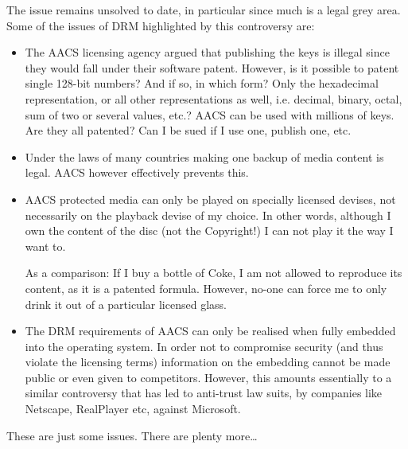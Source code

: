 The issue remains unsolved to date, in particular since much is a legal grey
area.  Some of the issues of DRM highlighted by this controversy are:
\begin{itemize}
\item The AACS licensing agency argued that publishing the keys is illegal since
  they would fall under their software patent.  However, is it possible to
  patent single 128-bit numbers? And if so, in which form? Only the hexadecimal
  representation, or all other representations as well, i.e. decimal, binary,
  octal, sum of two or several values, etc.?  AACS can be used with millions
  of keys. Are they all patented? Can I be sued if I use one, publish one, etc.
\item Under the laws of many countries making one backup of media content is
  legal. AACS however effectively prevents this.
\item AACS protected media can only be played on specially licensed devises, not
  necessarily on the playback devise of my choice.  In other words, although I
  own the content of the disc (not the Copyright!) I can not play it the way I
  want to.

  As a comparison: If I buy a bottle of Coke, I am not allowed to reproduce its
  content, as it is a patented formula. However, no-one can force me to only
  drink it out of a particular licensed glass.
\item The DRM requirements of AACS can only be realised when fully embedded into
  the operating system. In order not to compromise security (and thus violate
  the licensing terms) information on the embedding cannot be made public or
  even given to competitors.  However, this amounts essentially to a similar
  controversy that has led to anti-trust law suits, by companies like Netscape,
  RealPlayer etc, against Microsoft.
\end{itemize}
These are just some issues. There are plenty more\ldots

\endText

\ifText
\ExHead{\EXN}

\begin{enumerate}%
\ResumeExercises
{}
\StoreExercises
\end{enumerate}
\fi

\ifSolution
\beginSolution
{}
\begin{enumerate}%
  \ResumeSolutions
  \StoreSolutions
\end{enumerate}
\endSolution
\fi


